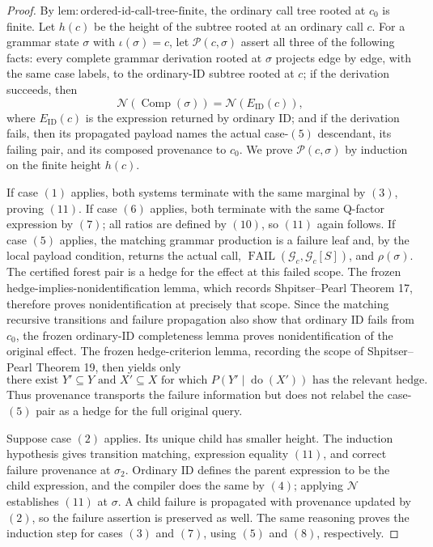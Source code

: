 \documentclass{article}
\begin{document}
\begin{proof}
By \(\mathrm{lem:ordered\text{-}id\text{-}call\text{-}tree\text{-}finite}\), the ordinary call tree rooted at \(c_0\) is finite.  Let \(h(c)\) be the height of the subtree rooted at an ordinary call \(c\).  For a grammar state \(\sigma\) with \(\iota(\sigma)=c\), let \(\mathcal P(c,\sigma)\) assert all three of the following facts: every complete grammar derivation rooted at \(\sigma\) projects edge by edge, with the same case labels, to the ordinary-ID subtree rooted at \(c\); if the derivation succeeds, then
\[
 \mathcal N(\operatorname{Comp}(\sigma))
 =\mathcal N(E_{\mathrm{ID}}(c)),
 \tag{11}
\]
where \(E_{\mathrm{ID}}(c)\) is the expression returned by ordinary ID; and if the derivation fails, then its propagated payload names the actual case-\((5)\) descendant, its failing pair, and its composed provenance to \(c_0\).  We prove \(\mathcal P(c,\sigma)\) by induction on the finite height \(h(c)\).

If case \((1)\) applies, both systems terminate with the same marginal by \((3)\), proving \((11)\).  If case \((6)\) applies, both terminate with the same Q-factor expression by \((7)\); all ratios are defined by \((10)\), so \((11)\) again follows.  If case \((5)\) applies, the matching grammar production is a failure leaf and, by the local payload condition, returns the actual call, \(\operatorname{FAIL}(\mathcal G_c,\mathcal G_c[S])\), and \(\rho(\sigma)\).  The certified forest pair is a hedge for the effect at this failed scope.  The frozen hedge-implies-nonidentification lemma, which records Shpitser--Pearl Theorem 17, therefore proves nonidentification at precisely that scope.  Since the matching recursive transitions and failure propagation also show that ordinary ID fails from \(c_0\), the frozen ordinary-ID completeness lemma proves nonidentification of the original effect.  The frozen hedge-criterion lemma, recording the scope of Shpitser--Pearl Theorem 19, then yields only
\[
 \text{there exist }Y'\subseteq Y\text{ and }X'\subseteq X
 \text{ for which }P(Y'\mid\operatorname{do}(X'))
 \text{ has the relevant hedge}.
 \tag{12}
\]
Thus provenance transports the failure information but does not relabel the case-\((5)\) pair as a hedge for the full original query.

Suppose case \((2)\) applies.  Its unique child has smaller height.  The induction hypothesis gives transition matching, expression equality \((11)\), and correct failure provenance at \(\sigma_2\).  Ordinary ID defines the parent expression to be the child expression, and the compiler does the same by \((4)\); applying \(\mathcal N\) establishes \((11)\) at \(\sigma\).  A child failure is propagated with provenance updated by \((2)\), so the failure assertion is preserved as well.  The same reasoning proves the induction step for cases \((3)\) and \((7)\), using \((5)\) and \((8)\), respectively.


\end{proof}
\end{document}
